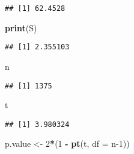 \documentclass[]{article}
\newenvironment{Shaded}{\begin{snugshade}}{\end{snugshade}}
\newcommand{\CommentTok}[1]{\textcolor[rgb]{0.56,0.35,0.01}{\textit{#1}}}
\newcommand{\DataTypeTok}[1]{\textcolor[rgb]{0.13,0.29,0.53}{#1}}
\newcommand{\DecValTok}[1]{\textcolor[rgb]{0.00,0.00,0.81}{#1}}
\newcommand{\FloatTok}[1]{\textcolor[rgb]{0.00,0.00,0.81}{#1}}
\newcommand{\KeywordTok}[1]{\textcolor[rgb]{0.13,0.29,0.53}{\textbf{#1}}}
\newcommand{\NormalTok}[1]{#1}
\newcommand{\OperatorTok}[1]{\textcolor[rgb]{0.81,0.36,0.00}{\textbf{#1}}}
\newcommand{\StringTok}[1]{\textcolor[rgb]{0.31,0.60,0.02}{#1}}
\begin{document}
\begin{Shaded}
\end{Shaded}

\begin{verbatim}
## [1] 62.4528
\end{verbatim}

\begin{Shaded}
\begin{Highlighting}[]
\KeywordTok{print}\NormalTok{(S)}
\end{Highlighting}
\end{Shaded}

\begin{verbatim}
## [1] 2.355103
\end{verbatim}

\begin{Shaded}
\begin{Highlighting}[]
\NormalTok{n}
\end{Highlighting}
\end{Shaded}

\begin{verbatim}
## [1] 1375
\end{verbatim}

\begin{Shaded}
\begin{Highlighting}[]
\NormalTok{t}
\end{Highlighting}
\end{Shaded}

\begin{verbatim}
## [1] 3.980324
\end{verbatim}

\begin{Shaded}
\begin{Highlighting}[]
\NormalTok{p.value <-}\StringTok{ }\DecValTok{2}\OperatorTok{*}\NormalTok{(}\DecValTok{1} \OperatorTok{-}\StringTok{ }\KeywordTok{pt}\NormalTok{(t, }\DataTypeTok{df =}\NormalTok{ n}\DecValTok{-1}\NormalTok{))}
\end{Highlighting}
\end{Shaded}
\end{document}
